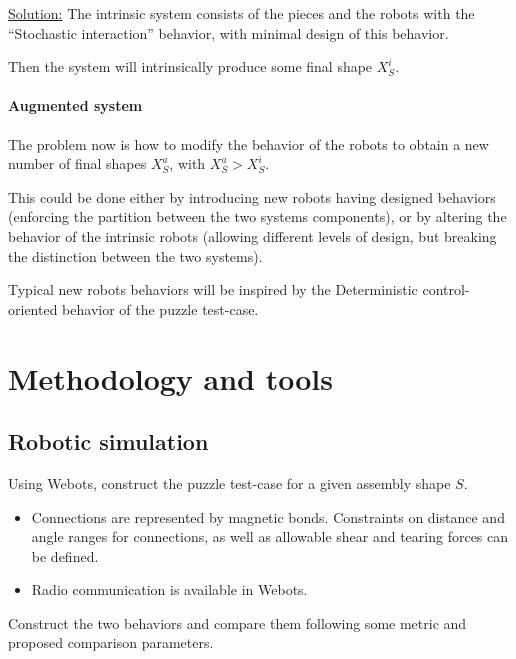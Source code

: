 \documentclass[letterpaper, oneside]{article}
\begin{document}
\underline{Solution:} The intrinsic system consists of the pieces and the robots with the ``Stochastic interaction'' behavior, with minimal design of this behavior.

Then the system will intrinsically produce some final shape $X_S^i$.

\paragraph{Augmented system} %
\label{par:augmented_system}
The problem now is how to modify the behavior of the robots to obtain a new number of final shapes $X_S^a$, with $X_S^a > X_S^i$.

This could be done either by introducing new robots having designed behaviors (enforcing the partition between the two systems components), or by altering the behavior of the intrinsic robots (allowing different levels of design, but breaking the distinction between the two systems).

Typical new robots behaviors will be inspired by the Deterministic control-oriented behavior of the puzzle test-case.



\section{Methodology and tools} %
\label{sec:methodology_and_tools}

\subsection{Robotic simulation} %
\label{sub:robotic_simulation}
Using Webots, construct the puzzle test-case for a given assembly shape $S$.

\begin{itemize}
	\item Connections are represented by magnetic bonds. Constraints on distance and angle ranges for connections,  as well as allowable shear and tearing forces can be defined.
	\item Radio communication is available in Webots.
\end{itemize}

Construct the two behaviors and compare them following some metric and proposed comparison parameters.
\end{document}
